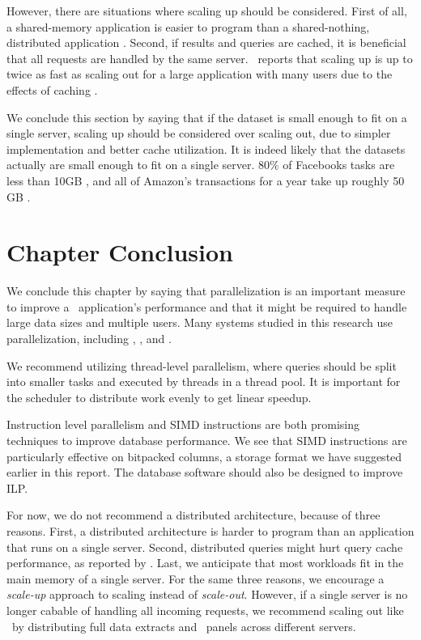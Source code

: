 However, there are situations where scaling up should be considered. First of all, a shared-memory application is easier to program than a shared-nothing, distributed application \cite{Boncz2002-yj}. Second, if results and queries are cached, it is beneficial that all requests are handled by the same server. \qlikview~reports that scaling up is up to twice as fast as scaling out for a large application with many users due to the effects of caching \cite{Qlik2012-ku}.

We conclude this section by saying that if the dataset is small enough to fit on a single server, scaling up should be considered over scaling out, due to simpler implementation and better cache utilization. It is indeed likely that the datasets actually are small enough to fit on a single server. 80\% of Facebooks tasks are less than 10GB \cite{Mukherjee2015-ul}, and all of Amazon's transactions for a year take up roughly 50 GB \cite{Kemper2011-ap}.

\section{Chapter Conclusion}
\label{sec:Chapter Conclusion}
We conclude this chapter by saying that parallelization is an important measure to improve a \bd~application's performance and that it might be required to handle large data sizes and multiple users. Many systems studied in this research use parallelization, including \exasol, \tableau, and \qlikview.

We recommend utilizing thread-level parallelism, where queries should be split into smaller tasks and executed by threads in a thread pool. It is important for the scheduler to distribute work evenly to get linear speedup.

Instruction level parallelism and SIMD instructions are both promising techniques to improve database performance. We see that SIMD instructions are particularly effective on bitpacked columns, a storage format we have suggested earlier in this report. The database software should also be designed to improve ILP.

For now, we do not recommend a distributed architecture, because of three reasons. First, a distributed architecture is harder to program than an application that runs on a single server. Second, distributed queries might hurt query cache performance, as reported by \qlikview. Last, we anticipate that most workloads fit in the main memory of a single server. For the same three reasons, we encourage a \textit{scale-up} approach to scaling instead of \textit{scale-out}. However, if a single server is no longer cabable of handling all incoming requests, we recommend scaling out like \qlikview~by distributing full data extracts and \bd~panels across different servers.
